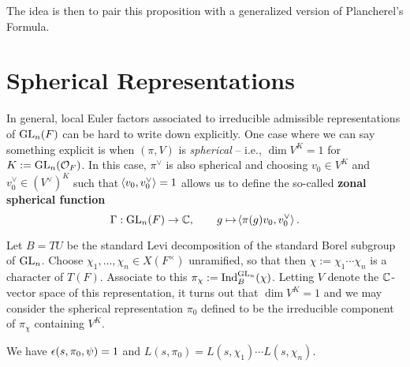 \documentclass[11pt]{article}
\newcommand{\Ind}{\textup{Ind}} %
\begin{document}
The idea is then to pair this proposition with a generalized version of Plancherel's Formula.

\section{Spherical Representations}
In general, local Euler factors associated to irreducible admissible representations of $\textup{GL}_n(F)$ can be hard to write down explicitly. One case where we can say something explicit is when $(\pi,V)$ is \emph{spherical} -- i.e., $\dim V^K=1$ for $K:=\textup{GL}_n(\mathcal{O}_F)$. In this case, $\pi^{\vee}$ is also spherical and choosing $v_0\in V^K$ and $v_0^{\vee}\in(V^{\vee})^K$ such that $\!\left\langle v_0,v_0^{\vee}\right\rangle=1$ allows us to define the so-called \textbf{zonal spherical function} 
$$\Gamma: \textup{GL}_n(F)\to\mathbb{C},\qquad g\mapsto\!\left\langle\pi(g)v_0,v_0^{\vee}\right\rangle.$$

Let $B=TU$ be the standard Levi decomposition of the standard Borel subgroup of $\textup{GL}_n$. Choose $\chi_1,\ldots,\chi_n\in X(F^{\times})$ unramified, so that then $\chi:=\chi_1\cdots\chi_n$ is a character of $T(F)$. Associate to this $\pi_{\chi}:=\Ind_B^{\GL_n}(\chi)$. Letting $V$ denote the $\mathbb{C}$-vector space of this representation, it turns out that $\dim V^K=1$ and we may consider the spherical representation $\pi_0$ defined to be the irreducible component of $\pi_{\chi}$ containing $V^K$.

\begin{theorem}
We have $\epsilon(s,\pi_0,\psi)=1$ and $L(s,\pi_0)=L(s,\chi_1)\cdots L(s,\chi_n)$.
\end{theorem}
\end{document}
